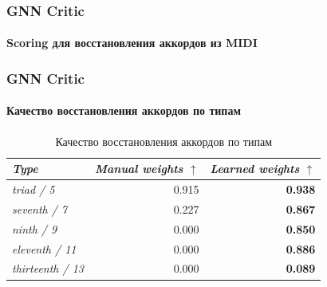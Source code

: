 \documentclass[aspectratio=169]{beamer}
\begin{document}
\begin{frame}
\frametitle{GNN Critic}
\framesubtitle{Scoring для восстановления аккордов из MIDI}
\begin{table}[htbp]
\caption{Сравнение ручного и обучаемого \textit{scoring} для восстановления аккордов из \textit{MIDI}}
\label{tab:chord-prediction-scoring}
\centering
\scriptsize
{}
\end{table}
\end{frame}

\begin{frame}
\frametitle{GNN Critic}
\framesubtitle{Качество восстановления аккордов по типам}
\begin{table}[htbp]
\caption{Качество восстановления аккордов по типам}
\label{tab:chord-type-accuracy}
\centering
\footnotesize
\begin{tabular}{@{}lrr@{}}
\toprule
\textit{Type} & \textit{Manual weights} $\uparrow$ & \textit{Learned weights} $\uparrow$ \\
\midrule
\textit{triad / 5} & 0.915 & \textbf{0.938} \\
\textit{seventh / 7} & 0.227 & \textbf{0.867} \\
\textit{ninth / 9} & 0.000 & \textbf{0.850} \\
\textit{eleventh / 11} & 0.000 & \textbf{0.886} \\
\textit{thirteenth / 13} & 0.000 & \textbf{0.089} \\
\bottomrule
\end{tabular}
\end{table}
\end{frame}
\end{document}

